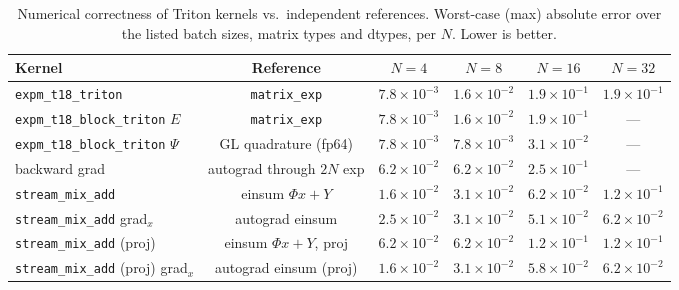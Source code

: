 \begin{table}[h]
\centering
\caption{Numerical correctness of Triton kernels vs.\ independent references. Worst-case (max) absolute error over the listed batch sizes, matrix types and dtypes, per $N$. Lower is better.}
\label{tab:expm_corr}
\begin{tabular}{lccccc}
\toprule
Kernel & Reference & $N{=}4$ & $N{=}8$ & $N{=}16$ & $N{=}32$ \\
\midrule
\texttt{expm\_t18\_triton}                & \texttt{matrix\_exp}      & $7.8{\times}10^{-3}$ & $1.6{\times}10^{-2}$ & $1.9{\times}10^{-1}$ & $1.9{\times}10^{-1}$ \\
\texttt{expm\_t18\_block\_triton} $E$     & \texttt{matrix\_exp}      & $7.8{\times}10^{-3}$ & $1.6{\times}10^{-2}$ & $1.9{\times}10^{-1}$ & --- \\
\texttt{expm\_t18\_block\_triton} $\Psi$  & GL quadrature (fp64)      & $7.8{\times}10^{-3}$ & $7.8{\times}10^{-3}$ & $3.1{\times}10^{-2}$ & --- \\
backward grad                             & autograd through $2N$ exp & $6.2{\times}10^{-2}$ & $6.2{\times}10^{-2}$ & $2.5{\times}10^{-1}$ & --- \\
\texttt{stream\_mix\_add}                 & einsum $\Phi x + Y$       & $1.6{\times}10^{-2}$ & $3.1{\times}10^{-2}$ & $6.2{\times}10^{-2}$ & $1.2{\times}10^{-1}$ \\
\texttt{stream\_mix\_add} grad$_x$        & autograd einsum           & $2.5{\times}10^{-2}$ & $3.1{\times}10^{-2}$ & $5.1{\times}10^{-2}$ & $6.2{\times}10^{-2}$ \\
\texttt{stream\_mix\_add} (proj)          & einsum $\Phi x + Y$, proj & $6.2{\times}10^{-2}$ & $6.2{\times}10^{-2}$ & $1.2{\times}10^{-1}$ & $1.2{\times}10^{-1}$ \\
\texttt{stream\_mix\_add} (proj) grad$_x$ & autograd einsum (proj)    & $1.6{\times}10^{-2}$ & $3.1{\times}10^{-2}$ & $5.8{\times}10^{-2}$ & $6.2{\times}10^{-2}$ \\
\bottomrule
\end{tabular}
\end{table}
